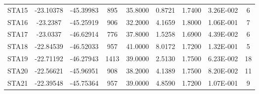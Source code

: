 \begin{center}
\begin{table}[!Ht]
\begin{tabular}{| c | c | c | c | c | c | c | c | c |}
STA15 & -23.10378 & -45.39983 & 895 & 35.8000 & 0.8721 & 1.7400 & 3.26E-002 & 6\\
STA16 & -23.2387 & -45.25919 & 906 & 32.2000 & 4.1659 & 1.8000 & 1.06E-001 & 7\\
STA17 & -23.0337 & -46.62914 & 776 & 37.8000 & 1.5258 & 1.6900 & 4.39E-002 & 6\\
STA18 & -22.84539 & -46.52033 & 957 & 41.0000 & 8.0172 & 1.7200 & 1.32E-001 & 5\\
STA19 & -22.71192 & -46.27943 & 1413 & 39.0000 & 2.5130 & 1.7500 & 6.23E-002 & 18\\
STA20 & -22.56621 & -45.96951 & 908 & 38.2000 & 4.1389 & 1.7500 & 8.20E-002 & 11\\
STA21 & -22.39548 & -45.75364 & 957 & 39.0000 & 4.8590 & 1.7200 & 1.07E-001 & 9\\
\hline
\end{tabular}
\label{tabelaMoho}
\end{table}
\end{center}
